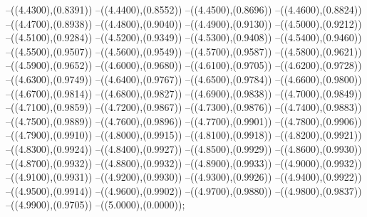{	--({\sx*(4.4300)},{\sy*(0.8391)})
	--({\sx*(4.4400)},{\sy*(0.8552)})
	--({\sx*(4.4500)},{\sy*(0.8696)})
	--({\sx*(4.4600)},{\sy*(0.8824)})
	--({\sx*(4.4700)},{\sy*(0.8938)})
	--({\sx*(4.4800)},{\sy*(0.9040)})
	--({\sx*(4.4900)},{\sy*(0.9130)})
	--({\sx*(4.5000)},{\sy*(0.9212)})
	--({\sx*(4.5100)},{\sy*(0.9284)})
	--({\sx*(4.5200)},{\sy*(0.9349)})
	--({\sx*(4.5300)},{\sy*(0.9408)})
	--({\sx*(4.5400)},{\sy*(0.9460)})
	--({\sx*(4.5500)},{\sy*(0.9507)})
	--({\sx*(4.5600)},{\sy*(0.9549)})
	--({\sx*(4.5700)},{\sy*(0.9587)})
	--({\sx*(4.5800)},{\sy*(0.9621)})
	--({\sx*(4.5900)},{\sy*(0.9652)})
	--({\sx*(4.6000)},{\sy*(0.9680)})
	--({\sx*(4.6100)},{\sy*(0.9705)})
	--({\sx*(4.6200)},{\sy*(0.9728)})
	--({\sx*(4.6300)},{\sy*(0.9749)})
	--({\sx*(4.6400)},{\sy*(0.9767)})
	--({\sx*(4.6500)},{\sy*(0.9784)})
	--({\sx*(4.6600)},{\sy*(0.9800)})
	--({\sx*(4.6700)},{\sy*(0.9814)})
	--({\sx*(4.6800)},{\sy*(0.9827)})
	--({\sx*(4.6900)},{\sy*(0.9838)})
	--({\sx*(4.7000)},{\sy*(0.9849)})
	--({\sx*(4.7100)},{\sy*(0.9859)})
	--({\sx*(4.7200)},{\sy*(0.9867)})
	--({\sx*(4.7300)},{\sy*(0.9876)})
	--({\sx*(4.7400)},{\sy*(0.9883)})
	--({\sx*(4.7500)},{\sy*(0.9889)})
	--({\sx*(4.7600)},{\sy*(0.9896)})
	--({\sx*(4.7700)},{\sy*(0.9901)})
	--({\sx*(4.7800)},{\sy*(0.9906)})
	--({\sx*(4.7900)},{\sy*(0.9910)})
	--({\sx*(4.8000)},{\sy*(0.9915)})
	--({\sx*(4.8100)},{\sy*(0.9918)})
	--({\sx*(4.8200)},{\sy*(0.9921)})
	--({\sx*(4.8300)},{\sy*(0.9924)})
	--({\sx*(4.8400)},{\sy*(0.9927)})
	--({\sx*(4.8500)},{\sy*(0.9929)})
	--({\sx*(4.8600)},{\sy*(0.9930)})
	--({\sx*(4.8700)},{\sy*(0.9932)})
	--({\sx*(4.8800)},{\sy*(0.9932)})
	--({\sx*(4.8900)},{\sy*(0.9933)})
	--({\sx*(4.9000)},{\sy*(0.9932)})
	--({\sx*(4.9100)},{\sy*(0.9931)})
	--({\sx*(4.9200)},{\sy*(0.9930)})
	--({\sx*(4.9300)},{\sy*(0.9926)})
	--({\sx*(4.9400)},{\sy*(0.9922)})
	--({\sx*(4.9500)},{\sy*(0.9914)})
	--({\sx*(4.9600)},{\sy*(0.9902)})
	--({\sx*(4.9700)},{\sy*(0.9880)})
	--({\sx*(4.9800)},{\sy*(0.9837)})
	--({\sx*(4.9900)},{\sy*(0.9705)})
	--({\sx*(5.0000)},{\sy*(0.0000)});
}
\def\xwerted{
\fill[color=red] (0.0000,0) circle[radius={0.07/\skala}];
\fill[color=red] (0.6250,0) circle[radius={0.07/\skala}];
\fill[color=red] (1.2500,0) circle[radius={0.07/\skala}];
\fill[color=red] (1.8750,0) circle[radius={0.07/\skala}];
\fill[color=red] (2.5000,0) circle[radius={0.07/\skala}];
\fill[color=red] (3.1250,0) circle[radius={0.07/\skala}];
\fill[color=red] (3.7500,0) circle[radius={0.07/\skala}];
\fill[color=red] (4.3750,0) circle[radius={0.07/\skala}];
\fill[color=red] (5.0000,0) circle[radius={0.07/\skala}];
}
\def\punkted{8}
\def\maxfehlerd{1.475\cdot 10^{-3}}
